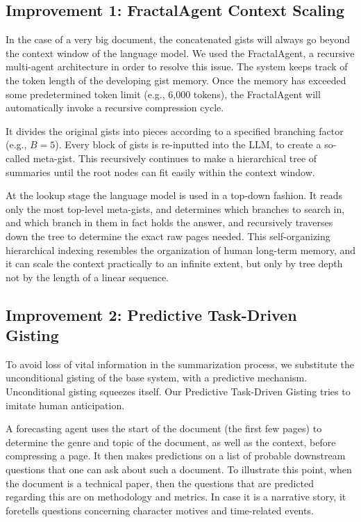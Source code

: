 \documentclass[conference]{IEEEtran}
\begin{document}
\subsection{Improvement 1: FractalAgent Context Scaling}
In the case of a very big document, the concatenated gists will always go beyond the context window of the language model. We used the FractalAgent, a recursive multi-agent architecture in order to resolve this issue. The system keeps track of the token length of the developing gist memory. Once the memory has exceeded some predetermined token limit (e.g., 6,000 tokens), the FractalAgent will automatically invoke a recursive compression cycle. 

It divides the original gists into pieces according to a specified branching factor (e.g., $B=5$). Every block of gists is re-inputted into the LLM, to create a so-called meta-gist. This recursively continues to make a hierarchical tree of summaries until the root nodes can fit easily within the context window. 

At the lookup stage the language model is used in a top-down fashion. It reads only the most top-level meta-gists, and determines which branches to search in, and which branch in them in fact holds the answer, and recursively traverses down the tree to determine the exact raw pages needed. This self-organizing hierarchical indexing resembles the organization of human long-term memory, and it can scale the context practically to an infinite extent, but only by tree depth not by the length of a linear sequence.

\subsection{Improvement 2: Predictive Task-Driven Gisting}
To avoid loss of vital information in the summarization process, we substitute the unconditional gisting of the base system, with a predictive mechanism. Unconditional gisting squeezes itself. Our Predictive Task-Driven Gisting tries to imitate human anticipation.

A forecasting agent uses the start of the document (the first few pages) to determine the genre and topic of the document, as well as the context, before compressing a page. It then makes predictions on a list of probable downstream questions that one can ask about such a document. To illustrate this point, when the document is a technical paper, then the questions that are predicted regarding this are on methodology and metrics. In case it is a narrative story, it foretells questions concerning character motives and time-related events.
\end{document}
